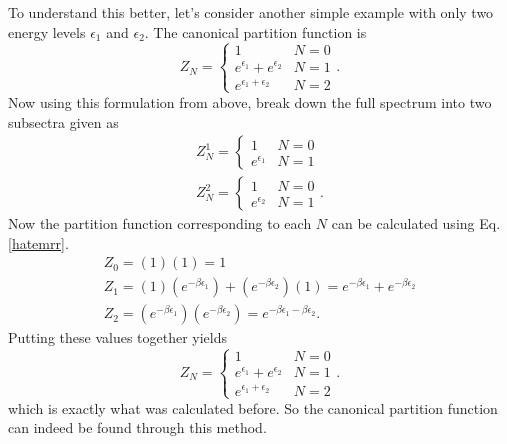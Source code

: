 To understand this better, let's consider another simple example with only two energy levels $\epsilon_1$ and $\epsilon_2$. The canonical partition function is 
\begin{equation}
    Z_N = \begin{cases}
    1 & N=0\\
    e^{\epsilon_1}+e^{\epsilon_2} & N=1\\
    e^{\epsilon_1+\epsilon_2} & N=2
    \end{cases}.
\end{equation}
Now using this formulation from above, break down the full spectrum into two subsectra given as 
\begin{gather}
    Z_N^1=\begin{cases}1&N=0\\e^{\epsilon_1}& N=1\end{cases}\\
    Z_N^2=\begin{cases}1&N=0\\e^{\epsilon_2}& N=1\end{cases}.
\end{gather}
Now the partition function corresponding to each $N$ can be calculated using Eq. \ref{hatemrr}.  
\begin{gather}
    Z_0= (1)(1)=1\\
    Z_1= (1)(e^{-\beta\epsilon_1})+(e^{-\beta\epsilon_2})(1)=e^{-\beta\epsilon_1}+e^{-\beta\epsilon_2}\\
    Z_2=(e^{-\beta\epsilon_1})(e^{-\beta\epsilon_2})=e^{-\beta\epsilon_1-\beta\epsilon_2}.
\end{gather}
Putting these values together yields 
\begin{equation}
    Z_N = \begin{cases}
    1 & N=0\\
    e^{\epsilon_1}+e^{\epsilon_2} & N=1\\
    e^{\epsilon_1+\epsilon_2} & N=2
    \end{cases}.
\end{equation}
which is exactly what was calculated before. So the canonical partition function can indeed be found through this method.